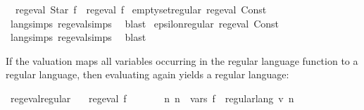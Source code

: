 \begin{isabellebody}
\ \ {\isachardoublequoteopen}reg{\isacharunderscore}{\kern0pt}eval\ {\isacharparenleft}{\kern0pt}Star\ f{\isacharparenright}{\kern0pt}\ {\isasymlongleftrightarrow}\ reg{\isacharunderscore}{\kern0pt}eval\ f{\isachardoublequoteclose}\isanewline
\isanewline
\isanewline
{}\isamarkupfalse%
\ emptyset{\isacharunderscore}{\kern0pt}regular{\isacharcolon}{\kern0pt}\ {\isachardoublequoteopen}reg{\isacharunderscore}{\kern0pt}eval\ {\isacharparenleft}{\kern0pt}Const\ {\isacharbraceleft}{\kern0pt}{\isacharbraceright}{\kern0pt}{\isacharparenright}{\kern0pt}{\isachardoublequoteclose}\isanewline
%
\isadelimproof
\ \ %
\endisadelimproof
%
\isatagproof
{}\isamarkupfalse%
\ lang{\isachardot}{\kern0pt}simps{\isacharparenleft}{\kern0pt}{}{\isacharparenright}{\kern0pt}\ reg{\isacharunderscore}{\kern0pt}eval{\isachardot}{\kern0pt}simps{\isacharparenleft}{\kern0pt}{}{\isacharparenright}{\kern0pt}\ \isamarkupfalse%
\ blast%
\endisatagproof
{\isafoldproof}%
%
\isadelimproof
\isanewline
%
\endisadelimproof
\isanewline
{}\isamarkupfalse%
\ epsilon{\isacharunderscore}{\kern0pt}regular{\isacharcolon}{\kern0pt}\ {\isachardoublequoteopen}reg{\isacharunderscore}{\kern0pt}eval\ {\isacharparenleft}{\kern0pt}Const\ {\isacharbraceleft}{\kern0pt}{\isacharbrackleft}{\kern0pt}{\isacharbrackright}{\kern0pt}{\isacharbraceright}{\kern0pt}{\isacharparenright}{\kern0pt}{\isachardoublequoteclose}\isanewline
%
\isadelimproof
\ \ %
\endisadelimproof
%
\isatagproof
{}\isamarkupfalse%
\ lang{\isachardot}{\kern0pt}simps{\isacharparenleft}{\kern0pt}{}{\isacharparenright}{\kern0pt}\ reg{\isacharunderscore}{\kern0pt}eval{\isachardot}{\kern0pt}simps{\isacharparenleft}{\kern0pt}{}{\isacharparenright}{\kern0pt}\ \isamarkupfalse%
\ blast%
\endisatagproof
{\isafoldproof}%
%
\isadelimproof
%
\endisadelimproof
%
\begin{isamarkuptext}%
If the valuation  maps all variables occurring in the regular language function  to
a regular language, then evaluating  again yields a regular language:%
\end{isamarkuptext}\isamarkuptrue%
\isamarkupfalse%
\ reg{\isacharunderscore}{\kern0pt}eval{\isacharunderscore}{\kern0pt}regular{\isacharcolon}{\kern0pt}\isanewline
\ \ \ {\isachardoublequoteopen}reg{\isacharunderscore}{\kern0pt}eval\ f{\isachardoublequoteclose}\isanewline
\ \ \ \ \ \ \ {\isachardoublequoteopen}{\isasymAnd}n{\isachardot}{\kern0pt}\ n\ {\isasymin}\ vars\ f\ {\isasymLongrightarrow}\ regular{\isacharunderscore}{\kern0pt}lang\ {\isacharparenleft}{\kern0pt}v\ n{\isacharparenright}{\kern0pt}{\isachardoublequoteclose}\isanewline

\end{isabellebody}
